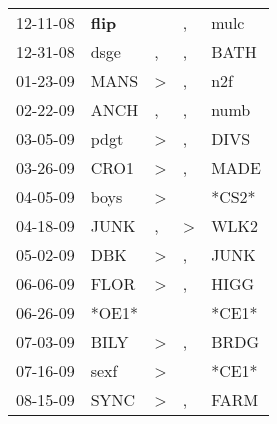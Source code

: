 \begin{supertabular}{p{0.07\textwidth}p{0.06\textwidth}p{0.02\textwidth}p{0.02\textwidth}p{0.06\textwidth}}
          12-11-08\textsuperscript{} &  \textbf{flip\textsuperscript{}} &                  &                , &           mulc\textsuperscript{} \\
          12-31-08\textsuperscript{} &           dsge\textsuperscript{} &                , &                , &           BATH\textsuperscript{} \\
          01-23-09\textsuperscript{} &           MANS\textsuperscript{} &     \textgreater &                , &            n2f\textsuperscript{} \\
          02-22-09\textsuperscript{} &           ANCH\textsuperscript{} &                , &                , &           numb\textsuperscript{} \\
          03-05-09\textsuperscript{} &           pdgt\textsuperscript{} &     \textgreater &                , &           DIVS\textsuperscript{} \\
          03-26-09\textsuperscript{} &           CRO1\textsuperscript{} &     \textgreater &                , &           MADE\textsuperscript{} \\
          04-05-09\textsuperscript{} &           boys\textsuperscript{} &     \textgreater &                  &                            *CS2* \\
          04-18-09\textsuperscript{} &           JUNK\textsuperscript{} &                , &     \textgreater &           WLK2\textsuperscript{} \\
          05-02-09\textsuperscript{} &            DBK\textsuperscript{} &     \textgreater &                , &           JUNK\textsuperscript{} \\
          06-06-09\textsuperscript{} &           FLOR\textsuperscript{} &     \textgreater &                , &           HIGG\textsuperscript{} \\
          06-26-09\textsuperscript{} &                            *OE1* &                  &                  &                            *CE1* \\
          07-03-09\textsuperscript{} &           BILY\textsuperscript{} &     \textgreater &                , &           BRDG\textsuperscript{} \\
          07-16-09\textsuperscript{} &           sexf\textsuperscript{} &     \textgreater &                  &                            *CE1* \\
          08-15-09\textsuperscript{} &           SYNC\textsuperscript{} &     \textgreater &                , &           FARM\textsuperscript{} \\

\end{supertabular}
